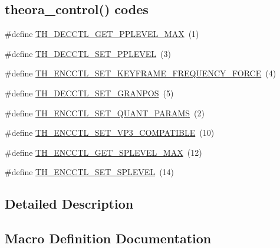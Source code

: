 \subsection*{theora\+\_\+control() codes}
\begin{DoxyCompactItemize}
\item 
\#define \hyperlink{group__oldfuncs_gab31f251c9319f2140d247585d30b3d07}{T\+H\+\_\+\+D\+E\+C\+C\+T\+L\+\_\+\+G\+E\+T\+\_\+\+P\+P\+L\+E\+V\+E\+L\+\_\+\+M\+AX}~(1)
\item 
\#define \hyperlink{group__oldfuncs_ga87774c35e1a755a84e2d705b38ebef0d}{T\+H\+\_\+\+D\+E\+C\+C\+T\+L\+\_\+\+S\+E\+T\+\_\+\+P\+P\+L\+E\+V\+EL}~(3)
\item 
\#define \hyperlink{group__oldfuncs_ga27e755e15b4b5604c54974b304037a49}{T\+H\+\_\+\+E\+N\+C\+C\+T\+L\+\_\+\+S\+E\+T\+\_\+\+K\+E\+Y\+F\+R\+A\+M\+E\+\_\+\+F\+R\+E\+Q\+U\+E\+N\+C\+Y\+\_\+\+F\+O\+R\+CE}~(4)
\item 
\#define \hyperlink{group__oldfuncs_ga1e870c654d35394f0d490045df04e0f5}{T\+H\+\_\+\+D\+E\+C\+C\+T\+L\+\_\+\+S\+E\+T\+\_\+\+G\+R\+A\+N\+P\+OS}~(5)
\item 
\#define \hyperlink{group__oldfuncs_ga3befcdd66678f8d27034f9c4b16d1b9c}{T\+H\+\_\+\+E\+N\+C\+C\+T\+L\+\_\+\+S\+E\+T\+\_\+\+Q\+U\+A\+N\+T\+\_\+\+P\+A\+R\+A\+MS}~(2)
\item 
\#define \hyperlink{group__oldfuncs_ga382d685a39a34d8e6ba76b00d804efd8}{T\+H\+\_\+\+E\+N\+C\+C\+T\+L\+\_\+\+S\+E\+T\+\_\+\+V\+P3\+\_\+\+C\+O\+M\+P\+A\+T\+I\+B\+LE}~(10)
\item 
\#define \hyperlink{group__oldfuncs_ga9baf5bdd206e80c78a8fd44687e89783}{T\+H\+\_\+\+E\+N\+C\+C\+T\+L\+\_\+\+G\+E\+T\+\_\+\+S\+P\+L\+E\+V\+E\+L\+\_\+\+M\+AX}~(12)
\item 
\#define \hyperlink{group__oldfuncs_gabd9fbcb6a25a77d991d3620164fe59d6}{T\+H\+\_\+\+E\+N\+C\+C\+T\+L\+\_\+\+S\+E\+T\+\_\+\+S\+P\+L\+E\+V\+EL}~(14)
\end{DoxyCompactItemize}


\subsection{Detailed Description}


\subsection{Macro Definition Documentation}
\mbox{\label{group__oldfuncs_ga809cbad2eb36be17a235a3cadfb737ba}} 
